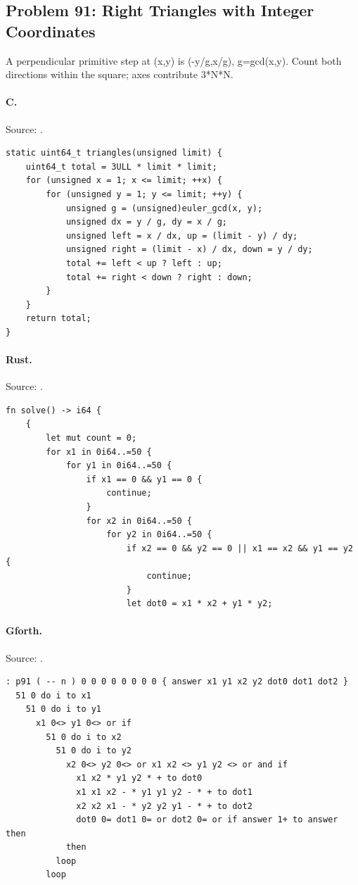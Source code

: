 \subsection{Problem 91: Right Triangles with Integer Coordinates}
\label{walkthrough:p91}
A perpendicular primitive step at (x,y) is (-y/g,x/g), g=gcd(x,y). Count both directions within the square; axes contribute 3*N*N.

\paragraph{C.} Source: .
\begin{lstlisting}
static uint64_t triangles(unsigned limit) {
    uint64_t total = 3ULL * limit * limit;
    for (unsigned x = 1; x <= limit; ++x) {
        for (unsigned y = 1; y <= limit; ++y) {
            unsigned g = (unsigned)euler_gcd(x, y);
            unsigned dx = y / g, dy = x / g;
            unsigned left = x / dx, up = (limit - y) / dy;
            unsigned right = (limit - x) / dx, down = y / dy;
            total += left < up ? left : up;
            total += right < down ? right : down;
        }
    }
    return total;
}
\end{lstlisting}

\paragraph{Rust.} Source: .
\begin{lstlisting}
fn solve() -> i64 {
    {
        let mut count = 0;
        for x1 in 0i64..=50 {
            for y1 in 0i64..=50 {
                if x1 == 0 && y1 == 0 {
                    continue;
                }
                for x2 in 0i64..=50 {
                    for y2 in 0i64..=50 {
                        if x2 == 0 && y2 == 0 || x1 == x2 && y1 == y2 {
                            continue;
                        }
                        let dot0 = x1 * x2 + y1 * y2;
\end{lstlisting}

\paragraph{Gforth.} Source: .
\begin{lstlisting}
: p91 ( -- n ) 0 0 0 0 0 0 0 0 { answer x1 y1 x2 y2 dot0 dot1 dot2 }
  51 0 do i to x1
    51 0 do i to y1
      x1 0<> y1 0<> or if
        51 0 do i to x2
          51 0 do i to y2
            x2 0<> y2 0<> or x1 x2 <> y1 y2 <> or and if
              x1 x2 * y1 y2 * + to dot0
              x1 x1 x2 - * y1 y1 y2 - * + to dot1
              x2 x2 x1 - * y2 y2 y1 - * + to dot2
              dot0 0= dot1 0= or dot2 0= or if answer 1+ to answer then
            then
          loop
        loop
\end{lstlisting}

